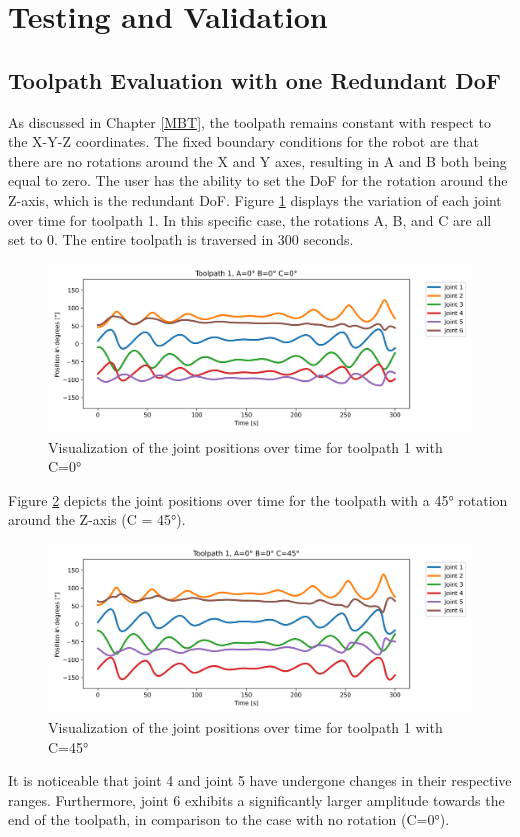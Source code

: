 \section{Testing and Validation}%

\subsection{Toolpath Evaluation with one Redundant DoF}
As discussed in Chapter \ref{MBT}, the toolpath remains constant with respect to the X-Y-Z coordinates. The fixed boundary conditions for the robot are that there are no rotations around the X and Y axes, resulting in A and B both being equal to zero. The user has the ability to set the \acrshort{DoF} for the rotation around the Z-axis, which is the redundant \acrshort{DoF}. Figure \ref{TP1ABC0} displays the variation of each joint over time for toolpath 1. In this specific case, the rotations A, B, and C are all set to 0. The entire toolpath is traversed in 300 seconds.

\begin{figure}[H]
	\centerline{\includegraphics[width=1\textwidth]{figures/TP1ABC0.png}}
	\caption{Visualization of the joint positions over time for toolpath 1 with C=0°}
	\label{TP1ABC0}
\end{figure}

Figure \ref{TP1ABC45} depicts the joint positions over time for the toolpath with a 45° rotation around the Z-axis (C = 45°). 
\begin{figure}[H]
	\centerline{\includegraphics[width=1\textwidth]{figures/TP1ABC45.png}}
	\caption{Visualization of the joint positions over time for toolpath 1 with C=45°}
	\label{TP1ABC45}
\end{figure}
\newpage
It is noticeable that joint 4 and joint 5 have undergone changes in their respective ranges. Furthermore, joint 6 exhibits a significantly larger amplitude towards the end of the toolpath, in comparison to the case with no rotation (C=0°).

